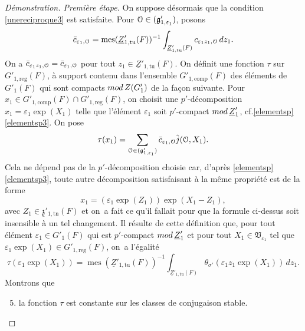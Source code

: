 \documentclass[11pt]{article}
\newcommand{\cf}{cf.\xspace}
\numberwithin{equation}{section}\providecommand{\og}{«\,}\providecommand{\fg}{\,»}
\let\mathcal \EuScript
\newcommand{\NoChangel}[1]{%
\expandafter\let\csname old\string#1\endcsname=#1
\let#1=\relax
\newcommand{#1}{\mathcode`l="716C\csname old\string#1\endcsname\mathcode`l="7160 }%
}
\let\epsilon\varepsilon
\newcommand{\rmod}{\textup{mod}\,}
\newcommand{\frg}{\mathfrak{g}}
\newcommand{\frz}{\mathfrak{z}}
\newcommand{\frV}{\mathfrak{V}}
\newcommand{\comp}{\mathrm{comp}}
\newcommand{\Nil}{\mathrm{Nil}} \NoChangel{\Nil}
\newcommand{\reg}{\mathrm{reg}}
\newcommand{\tn}{\mathrm{tn}}
\newcommand{\tu}{\mathrm{tu}}
\DeclareMathOperator{\mes}{mes}
\newcommand{\cO}{\mathcal{O}}
\theoremstyle{plain}
\theoremstyle{definition}
\renewcommand{\proofname}{Démonstration}
\begin{document}
\begin{proof}[\proofname. Première étape]
On suppose désormais que la condition \eqref{unereciproque3} est satisfaite. Pour $\cO\in \Nil(\frg'_{1,\epsilon_{1}})$, posons
\[
\bar{c}_{\epsilon_{1},\cO}=\mes(\underline{Z}'_{1,\tu}(F))^{-1}\int_{\underline{Z}'_{1,\tu}(F)}c_{\epsilon_{1}z_{1},\cO}\,dz_{1}.
\]
On a $\bar{c}_{\epsilon_{1}z_{1},\cO}=\bar{c}_{\epsilon_{1},\cO}$ pour tout $z_{1}\in \underline{Z}'_{1,\tu}(F)$. On définit une fonction $\tau$ sur $G'_{1,\reg}(F)$, à support contenu dans l'ensemble $G'_{1,\comp}(F)$ des éléments de $G'_{1}(F)$ qui sont compacts $\rmod Z(G'_{1})$ de la façon suivante. Pour $x_{1}\in G'_{1,\comp}(F)\cap G'_{1,\reg}(F)$, on choisit une $p'$-décomposition $x_{1}=\epsilon_{1}\exp(X_{1})$ telle que l'élément $\epsilon_{1}$ soit $p'$-compact $\rmod \underline{Z}'_{1}$, \cf \ref{elementsp}\,\eqref{elementsp3}. On pose
\[
\tau(x_{1})=\sum_{\cO\in \Nil(\frg'_{1,\epsilon_{1}})}\bar{c}_{\epsilon_{1},\cO}\hat{j}(\cO,X_{1}).
\]
Cela ne dépend pas de la $p'$-décomposition choisie car, d'après \ref{elementsp}\,\eqref{elementsp3}, toute autre décomposition satisfaisant à la même propriété est de la forme
\[
x_{1}=(\epsilon_{1}\exp(Z_{1}))\exp(X_{1}-Z_{1}),
\]
avec $Z_{1}\in \underline{\frz}'_{1,\tn}(F)$ et on~a fait ce qu'il fallait pour que la formule ci-dessus soit insensible à un tel changement. Il résulte de cette définition que, pour tout élément $\epsilon_{1}\in G'_{1}(F)$ qui est $p'$-compact $\rmod \underline{Z}'_{1}$ et pour tout $X_{1}\in \frV_{\epsilon_{1}}$ tel que $\epsilon_{1}\exp(X_{1})\in G'_{1,\reg}(F)$, on~a l'égalité
\begin{equation}\tag{4}\label{unereciproque4}
\tau(\epsilon_{1}\exp(X_{1}))=\mes(\underline{Z}'_{1,\tu}(F))^{-1}\int_{\underline{Z}'_{1,\tu}(F)}\theta_{\sigma'}(\epsilon_{1}z_{1}\exp(X_{1}))\,dz_{1}.
\end{equation}
Montrons que
\begin{enumerate}\setcounter{enumi}{4}
\item\label{unereciproque5}
la fonction $\tau$ est constante sur les classes de conjugaison stable.
\end{enumerate}


\end{proof}
\end{document}

